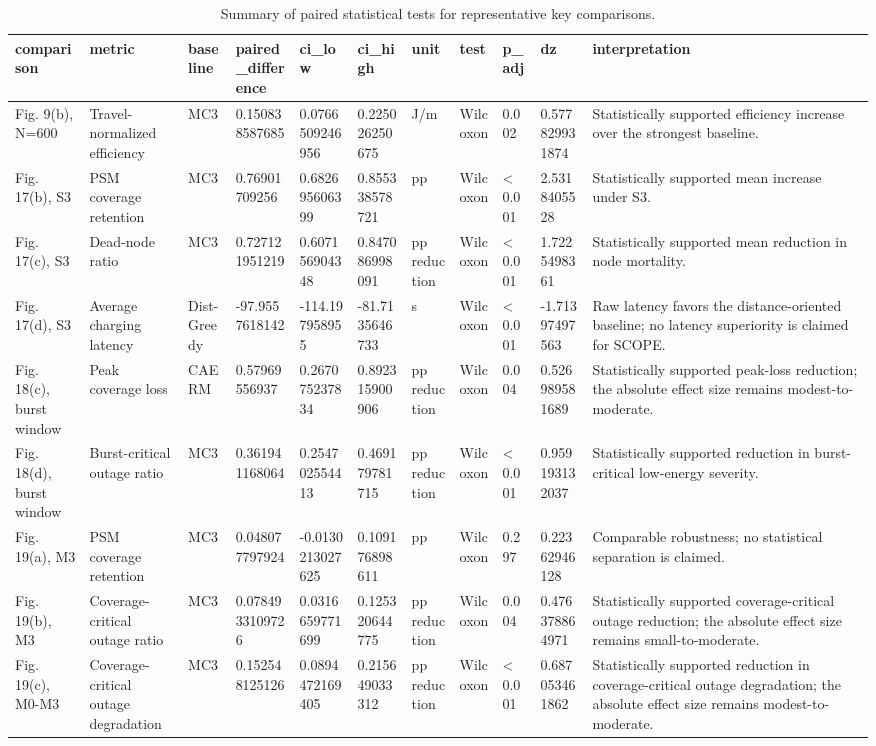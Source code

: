 \begin{table}[t]
\centering
\caption{Summary of paired statistical tests for representative key comparisons.}
\begin{tabular}{lllllllllll}
\hline
comparison & metric & baseline & paired\_difference & ci\_low & ci\_high & unit & test & p\_adj & dz & interpretation \\
\hline
Fig. 9(b), N=600 & Travel-normalized efficiency & MC3 & 0.150838587685 & 0.0766509246956 & 0.225026250675 & J/m & Wilcoxon & 0.002 & 0.577829931874 & Statistically supported efficiency increase over the strongest baseline. \\
Fig. 17(b), S3 & PSM coverage retention & MC3 & 0.76901709256 & 0.682695606399 & 0.855338578721 & pp & Wilcoxon & < 0.001 & 2.5318405528 & Statistically supported mean increase under S3. \\
Fig. 17(c), S3 & Dead-node ratio & MC3 & 0.727121951219 & 0.607156904348 & 0.847086998091 & pp reduction & Wilcoxon & < 0.001 & 1.7225498361 & Statistically supported mean reduction in node mortality. \\
Fig. 17(d), S3 & Average charging latency & Dist-Greedy & -97.9557618142 & -114.197958955 & -81.7135646733 & s & Wilcoxon & < 0.001 & -1.71397497563 & Raw latency favors the distance-oriented baseline; no latency superiority is claimed for SCOPE. \\
Fig. 18(c), burst window & Peak coverage loss & CAERM & 0.57969556937 & 0.267075237834 & 0.892315900906 & pp reduction & Wilcoxon & 0.004 & 0.526989581689 & Statistically supported peak-loss reduction; the absolute effect size remains modest-to-moderate. \\
Fig. 18(d), burst window & Burst-critical outage ratio & MC3 & 0.361941168064 & 0.254702554413 & 0.469179781715 & pp reduction & Wilcoxon & < 0.001 & 0.959193132037 & Statistically supported reduction in burst-critical low-energy severity. \\
Fig. 19(a), M3 & PSM coverage retention & MC3 & 0.048077797924 & -0.0130213027625 & 0.109176898611 & pp & Wilcoxon & 0.297 & 0.22362946128 & Comparable robustness; no statistical separation is claimed. \\
Fig. 19(b), M3 & Coverage-critical outage ratio & MC3 & 0.0784933109726 & 0.0316659771699 & 0.125320644775 & pp reduction & Wilcoxon & 0.004 & 0.476378864971 & Statistically supported coverage-critical outage reduction; the absolute effect size remains small-to-moderate. \\
Fig. 19(c), M0-M3 & Coverage-critical outage degradation & MC3 & 0.152548125126 & 0.0894472169405 & 0.215649033312 & pp reduction & Wilcoxon & < 0.001 & 0.687053461862 & Statistically supported reduction in coverage-critical outage degradation; the absolute effect size remains modest-to-moderate. \\

\end{tabular}
\end{table}
